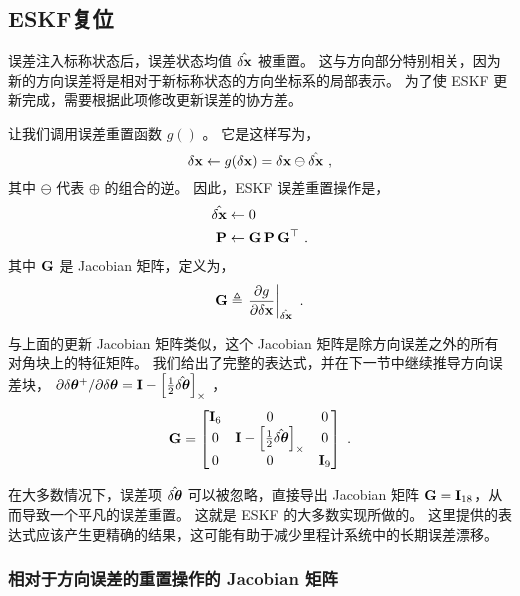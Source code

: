 {%
\subsection{ESKF复位}

误差注入标称状态后，误差状态均值 $\hat{\delta{\bf x}}$ 被重置。 
这与方向部分特别相关，因为新的方向误差将是相对于新标称状态的方向坐标系的局部表示。 
为了使 ESKF 更新完成，需要根据此项修改更新误差的协方差。

\bigskip

让我们调用误差重置函数 $g()$ 。 
它是这样写为，
%
\begin{equation}
\delta{\bf x} \gets g(\delta{\bf x}) = \delta{\bf x} \ominus \hat{\delta{\bf x}}~, \label{equ:resetFcn}
\end{equation}
%
其中 $\ominus$ 代表 $\oplus$ 的组合的逆。
因此，ESKF 误差重置操作是，
%
\begin{align}
\hat{\delta{\bf x}} &\gets 0 \\
{\bf P} &\gets {\bf G}\,{\bf P}\,{\bf G}^{\top}~.
\end{align}
%
其中 ${\bf G}$ 是 Jacobian 矩阵，定义为，
%
\begin{equation}
{\bf G} \triangleq \left.\frac{\partial g}{\partial\delta{\bf x}}\right|_{\hat{\delta{\bf x}}}~.
\end{equation}

与上面的更新 Jacobian 矩阵类似，这个 Jacobian 矩阵是除方向误差之外的所有对角块上的特征矩阵。 
我们给出了完整的表达式，并在下一节中继续推导方向误差块， $\partial\delta{\bm \theta}^+/\partial\delta{\bm \theta} = {\bf I} - \left[\frac12\hat{\delta{\bm \theta}}\right]_\times$ ，
%
\begin{equation}
{\bf G} = \begin{bmatrix}
{\bf I}_6 & 0 & 0 \\
0 & {\bf I} - \left[\frac12\hat{\delta{\bm \theta}}\right]_\times & 0 \\
0 & 0 & {\bf I}_9
\end{bmatrix}~.
\end{equation}

在大多数情况下，误差项 $\hat{\delta{\bm \theta}}$ 可以被忽略，直接导出 Jacobian 矩阵 ${\bf G}={\bf I}_{18}$，从而导致一个平凡的误差重置。 
这就是 ESKF 的大多数实现所做的。
这里提供的表达式应该产生更精确的结果，这可能有助于减少里程计系统中的长期误差漂移。


\subsubsection{相对于方向误差的重置操作的 Jacobian 矩阵}

}
